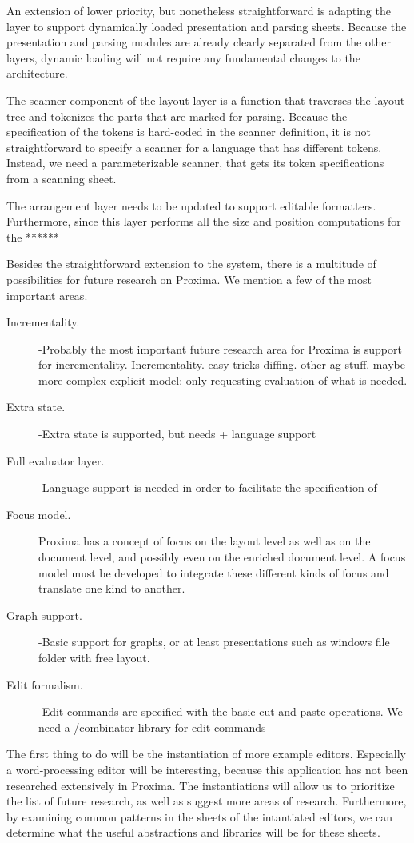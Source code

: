 An extension of lower priority, but nonetheless straightforward is adapting the layer to support dynamically loaded presentation and parsing sheets. Because the presentation and parsing modules are already clearly separated from the other layers, dynamic loading will not require any fundamental changes to the architecture.



The scanner component of the layout layer is a function that traverses the layout tree and tokenizes the parts that are marked for parsing. Because the specification of the tokens is hard-coded in the scanner definition, it is not straightforward to specify a scanner for a language that has different tokens. Instead, we need a parameterizable scanner, that gets its token specifications from a scanning sheet.


The arrangement layer needs to be updated to support editable formatters. Furthermore, since this layer performs all the size and position computations for the ******



Besides the straightforward extension to the system, there is a multitude of possibilities for future research on Proxima. We mention a few of the most important areas.

\toHere
\begin{description}
\item[Incrementality.] -Probably the most important future research area for Proxima is support for incrementality. Incrementality. easy tricks diffing. other ag stuff. maybe more complex explicit model: only requesting evaluation of what is needed.
\item[Extra state.] -Extra state is supported, but needs + language support  %
\item[Full evaluator layer.] -Language support is needed in order to facilitate the specification of 
\item[Focus model.] Proxima has a concept of focus on the layout level as well as on the document level, and possibly even on the enriched document level. A focus model must be developed to integrate these different kinds of focus and translate one kind to another.
\item[Graph support.] -Basic support for graphs, or at least presentations such as windows file folder with free layout.
\item[Edit formalism.] -Edit commands are specified with the basic cut and paste operations. We need a /combinator library for edit commands
\end{description}

\fromHere
The first thing to do will be the instantiation of more example editors. Especially a word-processing editor will be interesting, because this application has not been researched extensively in Proxima. The instantiations will allow us to prioritize the list of future research, as well as suggest more areas of research. Furthermore, by examining common patterns in the sheets of the intantiated editors, we can determine what the useful abstractions and libraries will be for these sheets.